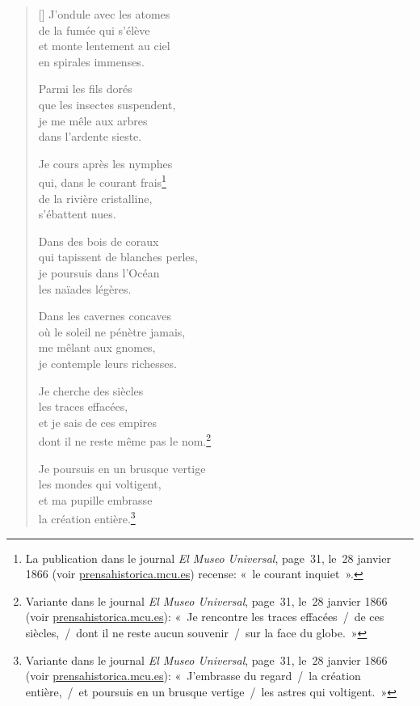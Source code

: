 \documentclass[a4paper,12pt]{book}
\begin{document}
\begin{verse}[\versewidth]
  J'ondule avec les atomes \\
  de la fumée qui s'élève \\
  et monte lentement au ciel \\
  en spirales immenses.

  Parmi les fils dorés \\
  que les insectes suspendent, \\
  je me mêle aux arbres \\
  dans l'ardente sieste.

  Je cours après les nymphes \\
  qui, dans le courant frais\footnote{La publication dans
le journal \emph{El Museo Universal}, page~31, le~28 janvier 1866
(voir \url{prensahistorica.mcu.es}) recense: «~le courant inquiet~».} \\
  de la rivière cristalline, \\
  s'ébattent nues.

  Dans des bois de coraux \\
  qui tapissent de blanches perles, \\
  je poursuis dans l'Océan \\
  les naïades légères.

  Dans les cavernes concaves \\
  où le soleil ne pénètre jamais, \\
  me mêlant aux gnomes, \\
  je contemple leurs richesses.

  Je cherche des siècles \\
  les traces effacées, \\
  et je sais de ces empires \\
  dont il ne reste même pas le nom.\footnote{Variante dans le journal
  \emph{El Museo Universal}, page~31, le~28 janvier 1866 (voir
  \url{prensahistorica.mcu.es}): «~Je rencontre les traces effacées~/~de ces siècles,~/~dont il ne reste aucun souvenir~/~sur la face du globe.~»}

  Je poursuis en un brusque vertige \\
  les mondes qui voltigent, \\
  et ma pupille embrasse \\
  la création entière.\footnote{Variante dans le journal
  \emph{El Museo Universal}, page~31, le~28 janvier 1866 (voir
  \url{prensahistorica.mcu.es}): «~J'embrasse du regard~/~la création
  entière,~/~et poursuis en un brusque vertige~/~les astres qui voltigent.~»}


\end{verse}
\end{document}
